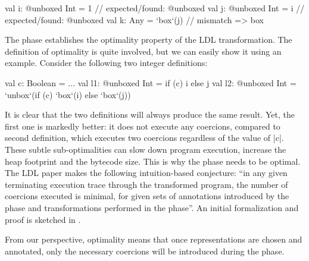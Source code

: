 
\begin{lstlisting-nobreak}
val i: @unboxed Int = 1 // expected/found: @unboxed
val j: @unboxed Int = i // expected/found: @unboxed
val k: Any = `box`(j)             // mismatch => box
\end{lstlisting-nobreak}

The \coerce{} phase establishes the optimality property of the LDL
transformation. The definition of optimality is quite involved,
but we can easily show it using an example.
Consider the following two integer definitions:

\begin{lstlisting-nobreak}
val c: Boolean = ...
val l1: @unboxed Int = if (c) i else j
val l2: @unboxed Int = `unbox`(if (c) `box`(i) else `box`(j))
\end{lstlisting-nobreak}

It is clear that the two definitions will always produce the same
result. Yet, the first one is markedly better: it does not execute
any coercions, compared to second definition, which executes two
coercions regardless of the value of |c|. These subtle
sub-optimalities can slow down program execution, increase the heap
footprint and the bytecode size. This is why the \coerce{} phase needs
to be optimal. The LDL paper \cite{ldl} makes the following
intuition-based conjecture: ``in any given terminating
execution trace through the transformed program, the number of
coercions executed is minimal,
for given sets of annotations introduced by
the \inject{} phase and transformations performed in the \commit{}
phase''. An initial formalization and proof is sketched in \cite{ldl-form}.

From our perspective, optimality means that once representations are chosen and annotated,
only the necessary coercions will be introduced during the \coerce{} phase.

